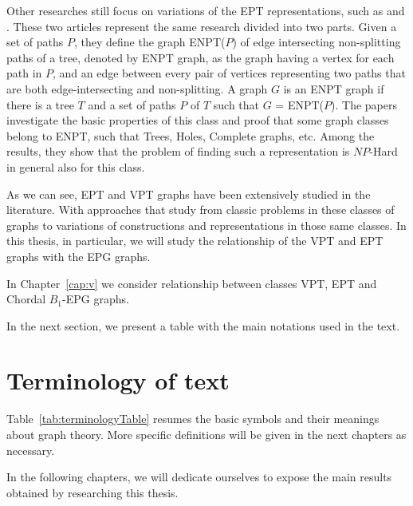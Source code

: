 Other researches still focus on variations of the EPT representations, such as \cite{boyaci2013graphs} and \cite{boyaci2016graphs}. These two articles represent the same research divided into two parts. Given a set of paths $P$, they define the graph ENPT($P$) of edge intersecting non-splitting paths of a tree, denoted by ENPT graph, as the graph having a vertex for each path in $P$, and an edge between every pair of vertices representing two paths that are both edge-intersecting and non-splitting. A graph $G$ is an ENPT graph if there is a tree $T$ and a set of paths $P$ of $T$ such that $G$ = ENPT($P$). The papers investigate the basic properties of this class and proof that some graph classes belong to ENPT, such that Trees, Holes, Complete graphs, etc. Among the results, they show that the problem of finding such a representation is $NP$-Hard in general also for this class.

As we can see, EPT and VPT graphs have been extensively studied in the literature. With approaches that study from classic problems in these classes of graphs to variations of constructions and representations in those same classes. In this thesis, in particular, we will study the relationship of the VPT and EPT graphs with the EPG graphs.

In Chapter~\ref{cap:v} we consider relationship between classes VPT, EPT and Chordal $B_1$-EPG graphs.

In the next section, we present a table with the main notations used in the text.


\section{Terminology of text}

Table~\ref{tab:terminologyTable} resumes the basic symbols and their meanings about graph theory.
More specific definitions will be given in the next chapters as necessary.



In the following chapters, we will dedicate ourselves to expose the main results obtained by researching this thesis.